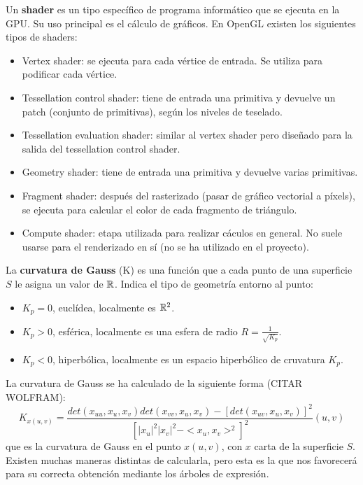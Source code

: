 \begin{definicion} Un \textbf{shader} es un tipo específico de programa informático que se ejecuta en la GPU. Su uso principal es el cálculo de gráficos. En OpenGL existen los siguientes tipos de shaders:
	\begin{itemize}
		\item Vertex shader: se ejecuta para cada vértice de entrada. Se utiliza para podificar cada vértice.
		\item Tessellation control shader: tiene de entrada una primitiva y devuelve un patch (conjunto de primitivas), según los niveles de teselado.
		\item Tessellation evaluation shader: similar al vertex shader pero diseñado para la salida del tessellation control shader.
		\item Geometry shader: tiene de entrada una primitiva y devuelve varias primitivas.
		\item Fragment shader: después del rasterizado (pasar de gráfico vectorial a píxels), se ejecuta para calcular el color de cada fragmento de triángulo.
		\item Compute shader: etapa utilizada para realizar cáculos en general. No suele usarse para el renderizado en sí (no se ha utilizado en el proyecto).
	\end{itemize}
\end{definicion}

\begin{definicion} La \textbf{curvatura de Gauss} (K) es una función que a cada punto de una superficie $S$ le asigna un valor de $\mathbb{R}$. Indica el tipo de geometría entorno al punto:
	\begin{itemize}
		\item $K_p = 0$, euclídea, localmente es $\mathbb{R}^2$.
		\item $K_p > 0$, esférica, localmente es una esfera de radio $R = \frac{1}{\sqrt{K_p}}$.
		\item $K_p < 0$, hiperbólica, localmente es un espacio hiperbólico de cruvatura $K_p$.
	\end{itemize}
La curvatura de Gauss se ha calculado de la siguiente forma (CITAR WOLFRAM):
		$$K_{x(u,v)} = \frac{det(x_{uu}, x_u, x_v) det(x_{vv}, x_u, x_v) - [det(x_{uv}, x_u, x_v)]^2} {[|x_u|^2|x_v|^2 - <x_u, x_v>^2]^2} (u, v)$$
	que es la curvatura de Gauss en el punto $x(u, v)$, con $x$ carta de la superficie $S$. Existen muchas maneras distintas de calcularla, pero esta es la que nos favorecerá para su correcta obtención mediante los árboles de expresión.
\end{definicion}

\endinput
